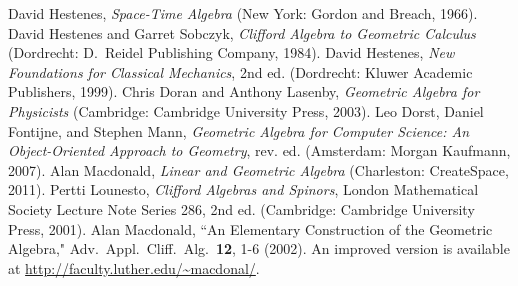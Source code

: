 \documentclass{utarticle}
\begin{document}
\begin{thebibliography}{99}
 David Hestenes, \textit{Space-Time Algebra} (New York: Gordon and Breach, 
               1966).
 David Hestenes and Garret Sobczyk, \textit{Clifford Algebra to
               Geometric Calculus} (Dordrecht: D.\ Reidel Publishing Company,    
               1984).
 David Hestenes, \textit{New Foundations for Classical
               Mechanics}, 2nd ed. (Dordrecht: Kluwer Academic Publishers, 1999).
 Chris Doran and Anthony Lasenby, \textit{Geometric Algebra for
                Physicists} (Cambridge: Cambridge University Press, 2003).
 Leo Dorst, Daniel Fontijne, and Stephen Mann, \textit{Geometric 
                Algebra for Computer Science: An Object-Oriented Approach to Geometry}, 
                rev. ed. (Amsterdam: Morgan Kaufmann, 2007).
 Alan Macdonald, \textit{Linear and Geometric Algebra} (Charleston: 
                CreateSpace, 2011).
 Pertti Lounesto, \textit{Clifford Algebras and Spinors}, London Mathematical
               Society Lecture Note Series 286, 2nd ed. (Cambridge: Cambridge University 
               Press, 2001).
 Alan Macdonald, ``An Elementary Construction of the Geometric 
                Algebra," Adv.\ Appl.\ Cliff.\ Alg.\ \textbf{12}, 1-6 (2002).  An improved version is 
                available at \url{http://faculty.luther.edu/~macdonal/}.
\end{thebibliography}
 
\end{document}
